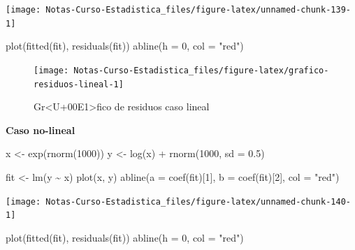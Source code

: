 \documentclass[
  12pt,
]{book}
\newenvironment{Shaded}{\begin{snugshade}}{\end{snugshade}}
\newcommand{\AttributeTok}[1]{\textcolor[rgb]{0.77,0.63,0.00}{#1}}
\newcommand{\DecValTok}[1]{\textcolor[rgb]{0.00,0.00,0.81}{#1}}
\newcommand{\FloatTok}[1]{\textcolor[rgb]{0.00,0.00,0.81}{#1}}
\newcommand{\FunctionTok}[1]{\textcolor[rgb]{0.00,0.00,0.00}{#1}}
\newcommand{\NormalTok}[1]{#1}
\newcommand{\OtherTok}[1]{\textcolor[rgb]{0.56,0.35,0.01}{#1}}
\newcommand{\SpecialCharTok}[1]{\textcolor[rgb]{0.00,0.00,0.00}{#1}}
\newcommand{\StringTok}[1]{\textcolor[rgb]{0.31,0.60,0.02}{#1}}
\theoremstyle{definition}
\theoremstyle{definition}
\theoremstyle{definition}
\theoremstyle{definition}
\theoremstyle{remark}
\begin{document}
\begin{center}\texttt{[image: Notas-Curso-Estadistica\_files/figure-latex/unnamed-chunk-139-1]} \end{center}

\begin{Shaded}
\begin{Highlighting}[]
\FunctionTok{plot}\NormalTok{(}\FunctionTok{fitted}\NormalTok{(fit), }\FunctionTok{residuals}\NormalTok{(fit))}
\FunctionTok{abline}\NormalTok{(}\AttributeTok{h =} \DecValTok{0}\NormalTok{, }\AttributeTok{col =} \StringTok{"red"}\NormalTok{)}
\end{Highlighting}
\end{Shaded}

\begin{figure}

{\centering \texttt{[image: Notas-Curso-Estadistica\_files/figure-latex/grafico-residuos-lineal-1]} 

}

\caption{Gr<U+00E1>fico de residuos caso lineal}\label{fig:grafico-residuos-lineal}
\end{figure}

\textbf{Caso no-lineal}

\begin{Shaded}
\begin{Highlighting}[]
\NormalTok{x }\OtherTok{\textless{}{-}} \FunctionTok{exp}\NormalTok{(}\FunctionTok{rnorm}\NormalTok{(}\DecValTok{1000}\NormalTok{))}
\NormalTok{y }\OtherTok{\textless{}{-}} \FunctionTok{log}\NormalTok{(x) }\SpecialCharTok{+} \FunctionTok{rnorm}\NormalTok{(}\DecValTok{1000}\NormalTok{, }\AttributeTok{sd =} \FloatTok{0.5}\NormalTok{)}

\NormalTok{fit }\OtherTok{\textless{}{-}} \FunctionTok{lm}\NormalTok{(y }\SpecialCharTok{\textasciitilde{}}\NormalTok{ x)}
\FunctionTok{plot}\NormalTok{(x, y)}
\FunctionTok{abline}\NormalTok{(}\AttributeTok{a =} \FunctionTok{coef}\NormalTok{(fit)[}\DecValTok{1}\NormalTok{], }\AttributeTok{b =} \FunctionTok{coef}\NormalTok{(fit)[}\DecValTok{2}\NormalTok{], }\AttributeTok{col =} \StringTok{"red"}\NormalTok{)}
\end{Highlighting}
\end{Shaded}

\begin{center}\texttt{[image: Notas-Curso-Estadistica\_files/figure-latex/unnamed-chunk-140-1]} \end{center}

\begin{Shaded}
\begin{Highlighting}[]
\FunctionTok{plot}\NormalTok{(}\FunctionTok{fitted}\NormalTok{(fit), }\FunctionTok{residuals}\NormalTok{(fit))}
\FunctionTok{abline}\NormalTok{(}\AttributeTok{h =} \DecValTok{0}\NormalTok{, }\AttributeTok{col =} \StringTok{"red"}\NormalTok{)}
\end{Highlighting}
\end{Shaded}
\end{document}
